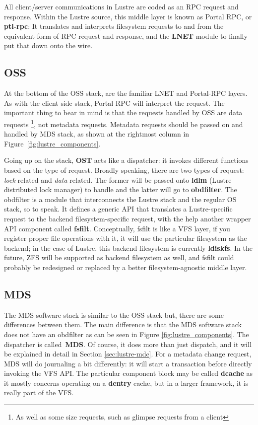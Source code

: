 All client/server communications in Lustre are coded as an RPC request and
response.  Within the Lustre source, this middle layer is known as Portal RPC, or
\textbf{ptl-rpc}: It translates and interprets filesystem requests to and
from the equivalent form of RPC request and response, and the \textbf{LNET} module to
finally put that down onto the wire.

\subsection*{OSS}

At the bottom of the OSS stack, are the familiar LNET and Portal-RPC
layers. As with the client side stack, Portal RPC will interpret the request.  The
important thing to bear in mind is that the requests handled by OSS are data
requests \footnote{As well as some size requests, such as glimpse requests from a
client}, not metadata requests. Metadata requests should be passed on and
handled by MDS stack, as shown at the rightmost column in
Figure~\ref{fig:lustre_components}.

Going up on the stack, \textbf{OST} acts like a dispatcher: it invokes
different functions based on the type of request. Broadly speaking, there are
two types of request: \textit{lock} related and \textit{data} related. The
former will be passed onto \textbf{ldlm} (Lustre distributed lock manager) to
handle and the latter will go to \textbf{obdfilter}.  The obdfilter is a module
that interconnects the Lustre stack and the regular OS stack, so to speak. It
defines a generic API that translates a Lustre-specific request to the
backend filesystem-specific request, with the help another wrapper API
component called \textbf{fsfilt}. Conceptually, fsfilt is like a VFS layer, if
you register proper file operations with it, it will use the particular
filesystem as the backend; in the case of Lustre, this backend filesystem
is currently \textbf{ldiskfs}. In the future, ZFS will be supported as backend
filesystem as well, and fsfilt could probably be redesigned or replaced by a
better filesystem-agnostic middle layer.

\subsection*{MDS}

The MDS software stack is similar to the OSS stack but, there are some
differences between them. The main difference is that the MDS software stack
does not have an obdfilter as can be seen in Figure
\ref{fig:lustre_components}. The dispatcher is called~\textbf{MDS}. Of course,
it does more than just dispatch, and it will be explained in detail in Section
\ref{sec:lustre-mdc}. For a metadata change request, MDS will do journaling a
bit differently: it will start a transaction before directly invoking the VFS
API. The particular component block may be called \textbf{dcache} as it mostly
concerns operating on a \textbf{dentry} cache, but in a larger framework, it is
really part of the VFS.

